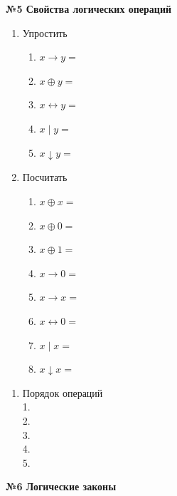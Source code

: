     \begin{center}
        \textbf{№5 Свойства логических операций}
    \end{center}
    \begin{minipage}[t]{0.3\textwidth}
        \centering
        \begin{enumerate}
            \item Упростить
            \begin{enumerate}
                \item $x \rightarrow y = $
                \item $x \oplus y = $
                \item $x \leftrightarrow y = $
                \item $x \mid y = $
                \item $x \downarrow y = $
            \end{enumerate}
        \end{enumerate}
    \end{minipage}
    \begin{minipage}[t]{0.3\textwidth}
        \centering
        \begin{enumerate}
            \setcounter{enumi}{1}
            \item Посчитать
            \begin{enumerate}
                \item $x \oplus x = $
                \item $x \oplus 0 = $
                \item $x \oplus 1 = $
                \item $x \rightarrow 0 = $
                \item $x \rightarrow x = $
                \item $x \leftrightarrow 0 = $
                \item $x \mid x = $
                \item $x \downarrow x = $
            \end{enumerate}
        \end{enumerate}
    \end{minipage}
    \begin{minipage}[t]{0.4\textwidth}
        \centering
        \begin{enumerate}
            \item Порядок операций\\
            1.\\
            2.\\
            3.\\
            4.\\
            5.\\
        \end{enumerate}
    \end{minipage}
    \newpage
    \begin{center}
        \textbf{№6 Логические законы}
    \end{center}

